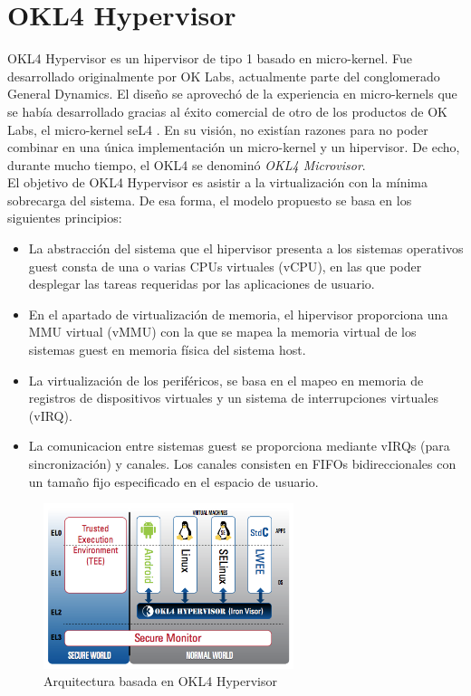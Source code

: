 \section{OKL4 Hypervisor}
OKL4 Hypervisor \cite{okl4} es un hipervisor de tipo 1 basado en micro-kernel. Fue desarrollado originalmente por OK Labs, actualmente parte del conglomerado General Dynamics. El diseño se aprovechó de la experiencia en micro-kernels que se había desarrollado gracias al éxito comercial de otro de los productos de OK Labs, el micro-kernel seL4 \cite{seL4}. En su visión, no existían razones para no poder combinar en una única implementación un micro-kernel y un hipervisor. De echo, durante mucho tiempo, el OKL4 se denominó \textit{OKL4 Microvisor}.\\
El objetivo de OKL4 Hypervisor es asistir a la virtualización con la mínima sobrecarga del sistema. De esa forma, el modelo propuesto se basa en los siguientes principios:
\begin{itemize}
  \item La abstracción del sistema que el hipervisor presenta a los sistemas operativos guest consta de una o varias CPUs virtuales (\acrshort{vCPU}), en las que poder desplegar las tareas requeridas por las aplicaciones de usuario.
  \item En el apartado de virtualización de memoria, el hipervisor proporciona una MMU virtual (\acrshort{vMMU}) con la que se mapea la memoria virtual de los sistemas guest en memoria física del sistema host.
  \item La virtualización de los periféricos, se basa en el mapeo en memoria de registros de dispositivos virtuales y un sistema de interrupciones virtuales (\acrshort{vIRQ}).
  \item La comunicacion entre sistemas guest se proporciona mediante \acrshort{vIRQ}s (para sincronización) y canales. Los canales consisten en FIFOs bidireccionales con un tamaño fijo especificado en el espacio de usuario.
\end{itemize}
\begin{figure}[!htb]
	\centering
	\includegraphics[width=0.65\textwidth]{recursos/OK_L4_Microvisor.png}
	\caption{Arquitectura basada en OKL4 Hypervisor}
	\label{fig:OK_L4_Microvisor}
\end{figure}
